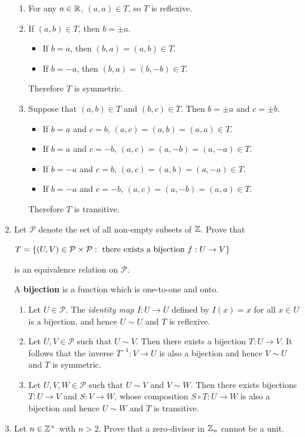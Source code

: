 \documentclass[11pt,fleqn,dvipsnames,usenames]{article}
\begin{document}
\begin{enumerate}
\solution
\begin{enumerate}[(1)]
\item For any $a\in\mathbb{R}$, $(a,a)\in T$, so $T$ is reflexive.
\item If $(a,b)\in T$, then $b =\pm a$.
\begin{itemize}[\ ]
\item If $b = a$, then $(b,a) = (a,b)\in T$.
\item If $b = -a$, then $(b,a) = (b,-b)\in T$.
\end{itemize}
Therefore $T$ is symmetric.
\item Suppose that $(a,b)\in T$ and $(b,c)\in T$.  Then $b = \pm a$ and $c = \pm b$.
\begin{itemize}[\ ]
\item If $b = a$ and $c = b$, $(a,c) = (a,b) = (a,a)\in T$.
\item If $b = a$ and $c = -b$, $(a,c) = (a,-b) = (a,-a)\in T$.
\item If $b = -a$ and $c = b$, $(a,c) = (a,b) = (a,-a)\in T$.
\item If $b = -a$ and $c = -b$, $(a,c) = (a,-b) = (a,a)\in T$.
\end{itemize}
Therefore $T$ is transitive.
\end{enumerate}
\item Let $\mathcal{P}$ denote the set of all non-empty subsets of $\mathbb{Z}$.  Prove that
\begin{center}
$T = \left\{(U,V)\in \mathcal{P}\times\mathcal{P}:\text{ there exists a bijection }f:U\to V\right\}$
\end{center}
is an equivalence relation on $\mathcal{P}$.
\vsmsp

\recall A \textbf{bijection} is a function which is one-to-one and onto.
\vsmsp

\solution
\begin{enumerate}[(1)]
\item Let $U\in \mathcal{P}$.  The \textit{identity map} $I:U\to U$ defined by $I(x) = x$ for all $x\in U$ is a bijection, and hence $U\sim U$ and $T$ is reflexive.
\item Let $U,V\in\mathcal{P}$ such that $U\sim V$.  Then there exists a bijection $T:U\to V$.  It follows that the inverse $T^{-1}:V\to U$ is also a bijection and hence $V\sim U$ and $T$ is symmetric.
\item Let $U,V, W\in\mathcal{P}$ such that $U\sim V$ and $V\sim W$.  Then there exists bijections $T:U\to V$ and $S:V\to W$, whose composition $S\circ T:U\to W$ is also a bijection and hence $U\sim W$ and $T$ is transitive.
\end{enumerate}
\item Let $n\in\mathbb{Z}^+$ with $n > 2$.  Prove that a zero-divisor in $\mathbb{Z}_n$ cannot be a unit.
\vsmsp


\end{enumerate}
\end{document}
